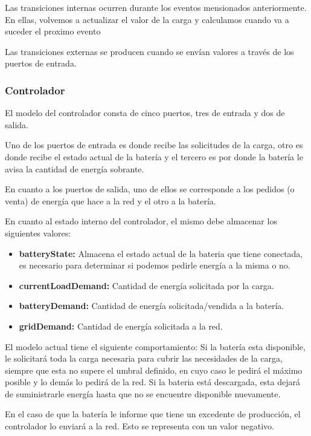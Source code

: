 Las transiciones internas ocurren durante los eventos mensionados anteriormente. En ellas,
volvemos a actualizar el valor de la carga y calculamos cuando va a suceder el proximo evento 

Las transiciones externas se producen cuando se envían valores a través de los puertos
de entrada. 

\subsubsection{Controlador}

El modelo del controlador consta de cinco puertos, tres de entrada y dos de salida.

Uno de los puertos de entrada es donde recibe las solicitudes de la carga, otro
es donde recibe el estado actual de la batería y el tercero es por donde la batería 
le avisa la cantidad de energía sobrante.

En cuanto a los puertos de salida, uno de ellos se corresponde a los pedidos (o venta) de 
energía que hace a la red y el otro a la batería.

En cuanto al estado interno del controlador, el mismo debe almacenar los siguientes valores:

\begin{itemize}
    \item \textbf{batteryState:} Almacena el estado actual de la bateria que tiene conectada,
    es necesario para determinar si podemos pedirle energía a la misma o no.
    \item \textbf{currentLoadDemand:} Cantidad de energía solicitada por la carga.
    \item \textbf{batteryDemand:} Cantidad de energía solicitada/vendida a la batería.
    \item \textbf{gridDemand:} Cantidad de energía solicitada a la red.
\end{itemize}

El modelo actual tiene el siguiente comportamiento: Si la batería esta disponible, le solicitará
toda la carga necesaria para cubrir las necesidades de la carga, siempre que esta no supere
el umbral definido, en cuyo caso le pedirá el máximo posible y lo demás lo pedirá de la red.
Si la bateria está descargada, esta dejará de suministrarle energía hasta que no se encuentre
disponible nuevamente.

En el caso de que la batería le informe que tiene un excedente de producción, el controlador
lo enviará a la red. Esto se representa con un valor negativo.

